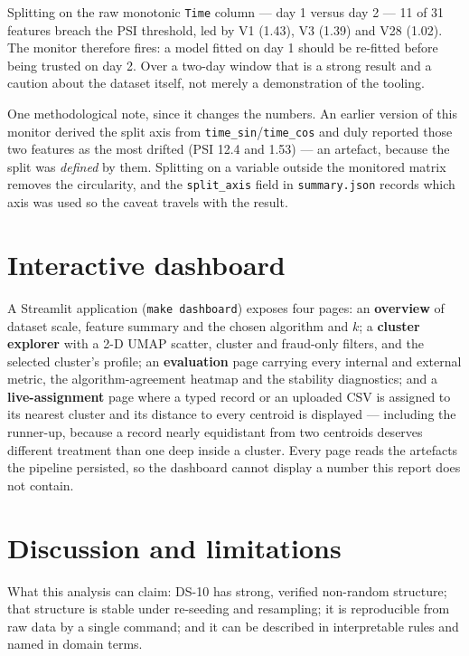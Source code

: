 \documentclass[11pt, a4paper]{article}
\providecommand{\num}[1]{#1}
\begin{document}


Splitting on the raw monotonic \texttt{Time} column --- day 1 versus day 2 ---
\num{11} of \num{31} features breach the PSI threshold, led by V1
(\num{1.43}), V3 (\num{1.39}) and V28 (\num{1.02}). The monitor therefore fires:
a model fitted on day 1 should be re-fitted before being trusted on day 2. Over a
two-day window that is a strong result and a caution about the dataset itself, not
merely a demonstration of the tooling.

One methodological note, since it changes the numbers. An earlier version of this
monitor derived the split axis from \texttt{time\_sin}/\texttt{time\_cos} and
duly reported those two features as the most drifted (PSI \num{12.4} and
\num{1.53}) --- an artefact, because the split was \emph{defined} by them.
Splitting on a variable outside the monitored matrix removes the circularity, and
the \texttt{split\_axis} field in \texttt{summary.json} records which axis was
used so the caveat travels with the result.

\section{Interactive dashboard}

A Streamlit application (\texttt{make dashboard}) exposes four pages: an
\textbf{overview} of dataset scale, feature summary and the chosen algorithm and
$k$; a \textbf{cluster explorer} with a 2-D UMAP scatter, cluster and
fraud-only filters, and the selected cluster's profile; an \textbf{evaluation}
page carrying every internal and external metric, the algorithm-agreement
heatmap and the stability diagnostics; and a \textbf{live-assignment} page where
a typed record or an uploaded CSV is assigned to its nearest cluster and its
distance to every centroid is displayed --- including the runner-up, because a
record nearly equidistant from two centroids deserves different treatment than
one deep inside a cluster. Every page reads the artefacts the pipeline persisted,
so the dashboard cannot display a number this report does not contain.

\section{Discussion and limitations}

What this analysis can claim: DS-10 has strong, verified non-random structure;
that structure is stable under re-seeding and resampling; it is reproducible from
raw data by a single command; and it can be described in interpretable rules and
named in domain terms.
\end{document}
